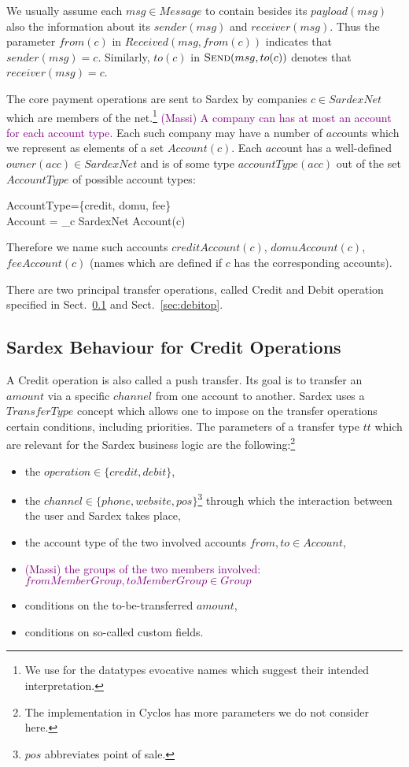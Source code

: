 We usually assume  each $msg \in Message$ to contain besides its $payload(msg)$ also the information about its $sender(msg)$ and $receiver(msg)$. Thus the parameter $from(c)$ in $Received(msg, from(c))$ indicates that $sender(msg)=c$. Similarly, $to(c)$ in $\hbox{\sc Send}(msg, to(c))$ denotes that $receiver(msg) = c$.

The core payment operations are sent to Sardex by companies $c \in SardexNet$ which are members of the net.\footnote{We use for the datatypes evocative names which suggest their intended interpretation.} \textcolor{purple}{(Massi) A company can has at most an account for each account type.} Each such company may have a number of $acc$ounts which we represent as elements of a set $Account(c)$. Each $acc$ount has a well-defined $owner(acc) \in SardexNet$ and is of some type $accountType(acc)$ out of the set $AccountType$ of possible account types:

\begin{asm}
AccountType=\{credit, domu, fee\} \\
Account = \bigcup_{c \in SardexNet} Account(c)
\end{asm}
Therefore we name such accounts $creditAccount(c)$, $domuAccount(c)$, $feeAccount(c)$ (names which are defined if $c$ has the corresponding accounts). 

There are two principal transfer operations, called Credit and Debit operation specified in Sect.~\ref{sec:creditop} and Sect.~\ref{sec:debitop}.

\subsection{Sardex Behaviour for Credit Operations}
\label{sec:creditop}

A Credit operation is also called a push transfer. Its goal is to transfer an $amount$ via a specific $channel$ from one account to another. Sardex uses a $TransferType$ concept which allows one to impose on the transfer operations certain conditions, including priorities. The parameters of a transfer type $tt$ which are relevant for the Sardex business logic are the following:\footnote{The implementation in Cyclos has more parameters we do not consider here.}

\begin{itemize}
	\item the $operation \in \{credit, debit\}$,
	\item the $channel \in \{phone,website,pos\}$\footnote{$pos$ abbreviates point of sale.} through which the interaction between the user and Sardex takes place,
	\item the account type of the two involved accounts $from,to \in Account$,
	\item \textcolor{purple}{(Massi) the groups of the two members involved: $fromMemberGroup,toMemberGroup \in Group$ }
	\item conditions on the to-be-transferred $amount$, 
	\item conditions on so-called custom fields.
\end{itemize}

